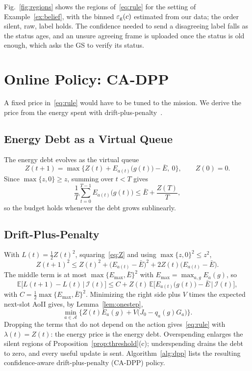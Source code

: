 \documentclass[10pt,journal,compsoc]{IEEEtran}
\theoremstyle{remark}
\newcommand{\E}{\mathbb{E}}
\newcommand{\A}{\mathcal{A}}
\newcommand{\I}{\mathcal{I}}
\newcommand{\ee}{\varepsilon}
\begin{document}
Fig.~\ref{fig:regions} shows the regions of~\eqref{eq:rule} for the setting of Example~\ref{ex:belief}, with the binned $\ee_{\rm g}(c)$ estimated from our data; the order silent, raw, label holds. The confidence needed to send a disagreeing label falls as the status ages, and an unsure agreeing frame is uploaded once the status is old enough, which asks the GS to verify its status.
\section{Online Policy: CA-DPP}\label{sec:lyap}
A fixed price in~\eqref{eq:rule} would have to be tuned to the mission. We derive the price from the energy spent with drift-plus-penalty~\cite{neely2010book}.

\subsection{Energy Debt as a Virtual Queue}
The energy debt evolves as the virtual queue
\begin{equation}\label{eq:Z}
Z(t+1)=\max\Big\{Z(t)+E_{a(t)}\big(g(t)\big)-\bar E,\ 0\Big\},\qquad Z(0)=0.
\end{equation}
Since $\max\{z,0\}\ge z$, summing over $t<T$ gives
\begin{equation}\label{eq:Zbound}
\frac1T\sum_{t=0}^{T-1}E_{a(t)}\big(g(t)\big)\le\bar E+\frac{Z(T)}{T},
\end{equation}
so the budget holds whenever the debt grows sublinearly.

\subsection{Drift-Plus-Penalty}
With $L(t)=\frac12Z(t)^2$, squaring~\eqref{eq:Z} and using $\max\{z,0\}^2\le z^2$,
\[
Z(t+1)^2\le Z(t)^2+\big(E_{a(t)}-\bar E\big)^2+2Z(t)\big(E_{a(t)}-\bar E\big).
\]
The middle term is at most $\max\{E_{\max},\bar E\}^2$ with $E_{\max}=\max_{a,g}E_a(g)$, so
\begin{equation}\label{eq:drift}
\E\big[L(t+1)-L(t)\,|\,\I(t)\big]\le C+Z(t)\,\E\Big[E_{a(t)}\big(g(t)\big)-\bar E\,\big|\,\I(t)\Big],
\end{equation}
with $C=\frac12\max\{E_{\max},\bar E\}^2$. Minimizing the right side plus $V$ times the expected next-slot AoII gives, by Lemma~\ref{lem:onestep},
\[
\min_{a\in\A}\Big\{Z(t)E_a(g)+V\big(J_0-q_a(g)G_a\big)\Big\}.
\]
Dropping the terms that do not depend on the action gives~\eqref{eq:rule} with $\lambda(t)=Z(t)$: the energy price is the energy debt. Overspending enlarges the silent regions of Proposition~\ref{prop:threshold}(c); underspending drains the debt to zero, and every useful update is sent. Algorithm~\ref{alg:dpp} lists the resulting confidence-aware drift-plus-penalty (CA-DPP) policy.
\end{document}
